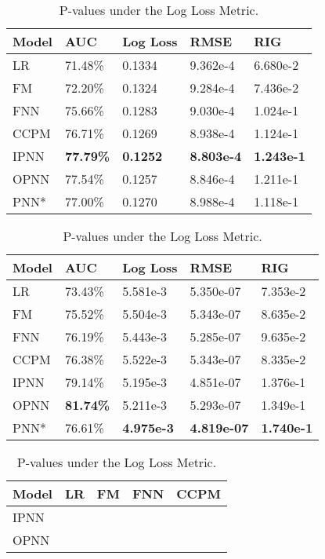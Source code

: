 \documentclass[conference]{IEEEtran}
\begin{document}
\begin{table}[t]
	\centering
	\caption{Overall Performance on the Criteo Dataset.}\label{tab:perf-criteo}
	\begin{tabular}{m{40pt}<{\centering} | m{35pt}<{\centering} m{35pt}<{\centering} m{35pt}<{\centering} m{35pt}<{\centering}}
		\hline
		Model & AUC & Log Loss & RMSE & RIG \\
		\hline
		LR & 71.48\% & 0.1334 & 9.362e-4 & 6.680e-2 \\
		FM & 72.20\% & 0.1324 & 9.284e-4 & 7.436e-2 \\
		FNN & 75.66\% & 0.1283 & 9.030e-4 & 1.024e-1 \\
		CCPM & 76.71\% & 0.1269 & 8.938e-4 & 1.124e-1 \\
		IPNN & \textbf{77.79\%} & \textbf{0.1252} & \textbf{8.803e-4} & \textbf{1.243e-1} \\
		OPNN & 77.54\% & 0.1257 & 8.846e-4 & 1.211e-1 \\
		PNN* & 77.00\% & 0.1270 & 8.988e-4 & 1.118e-1\\
		\hline
	\end{tabular}
\vspace{10pt}
	\centering
	\caption{Overall Performance on the iPinYou Dataset.}\label{tab:perf-ipinyou}
	\begin{tabular}{m{40pt}<{\centering} | m{35pt}<{\centering} m{35pt}<{\centering} m{35pt}<{\centering} m{35pt}<{\centering}}
		\hline
		Model & AUC & Log Loss & RMSE & RIG \\
		\hline
		LR & 73.43\% & 5.581e-3 & 5.350e-07 & 7.353e-2 \\
		FM & 75.52\% & 5.504e-3 & 5.343e-07 & 8.635e-2 \\
		FNN & 76.19\% & 5.443e-3 & 5.285e-07 & 9.635e-2 \\
		CCPM & 76.38\% & 5.522e-3 & 5.343e-07 & 8.335e-2 \\
		IPNN & 79.14\% & 5.195e-3 & 4.851e-07 & 1.376e-1\\
		OPNN & \textbf{81.74\%} & 5.211e-3 & 5.293e-07 & 1.349e-1 \\
		PNN* & 76.61\% & \textbf{4.975e-3} & \textbf{4.819e-07} & \textbf{1.740e-1}\\
		\hline
	\end{tabular}
\centering
	\vspace{10pt}
    \caption{P-values under the Log Loss Metric.}\label{tab:pvalue}
\begin{tabular}{m{40pt}<{\centering} | m{35pt}<{\centering} m{35pt}<{\centering} m{35pt}<{\centering} m{35pt}<{\centering}}
		\hline
		Model & LR & FM & FNN & CCPM \\
		\hline
		IPNN &  &  &  &  \\
		OPNN &  &  &  &  \\
		\hline
	\end{tabular}
\end{table}
\end{document}
